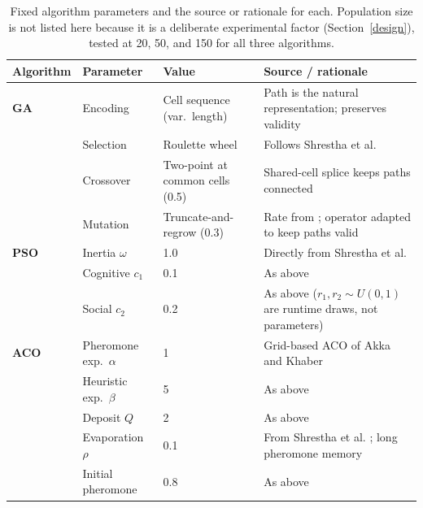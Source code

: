 \documentclass[11pt,a4paper]{article}
\begin{document}
    \begin{table}[ht]
        \centering
        \small
        \begin{tabularx}{\textwidth}{lllX}
\toprule
\textbf{Algorithm} & \textbf{Parameter} & \textbf{Value} & \textbf{Source / rationale} \\
\midrule
\textbf{GA}
& Encoding & Cell sequence (var.\ length) & Path is the natural representation; preserves validity \cite{benhlima2018,tu2003} \\
& Selection & Roulette wheel & Follows Shrestha et al. \cite{shrestha2024} \\
& Crossover & Two-point at common cells (0.5) & Shared-cell splice keeps paths connected \\
& Mutation & Truncate-and-regrow (0.3) & Rate from \cite{shrestha2024}; operator adapted to keep paths valid \\
\midrule
\textbf{PSO}
& Inertia $\omega$ & 1.0 & Directly from Shrestha et al. \cite{shrestha2024} \\
& Cognitive $c_1$ & 0.1 & As above \\
& Social $c_2$ & 0.2 & As above ($r_1,r_2\sim U(0,1)$ are runtime draws, not parameters) \\
\midrule
\textbf{ACO}
& Pheromone exp.\ $\alpha$ & 1 & Grid-based ACO of Akka and Khaber \cite{akka2018} \\
& Heuristic exp.\ $\beta$ & 5 & As above \\
& Deposit $Q$ & 2 & As above \\
& Evaporation $\rho$ & 0.1 & From Shrestha et al. \cite{shrestha2024}; long pheromone memory \\
& Initial pheromone & 0.8 & As above \\
\bottomrule
        \end{tabularx}
        \caption{Fixed algorithm parameters and the source or rationale for each. Population size is not listed here because it is a deliberate experimental factor (Section~\ref{design}), tested at 20, 50, and 150 for all three algorithms.}
        \label{tab:parameters}
    \end{table}
\end{document}
